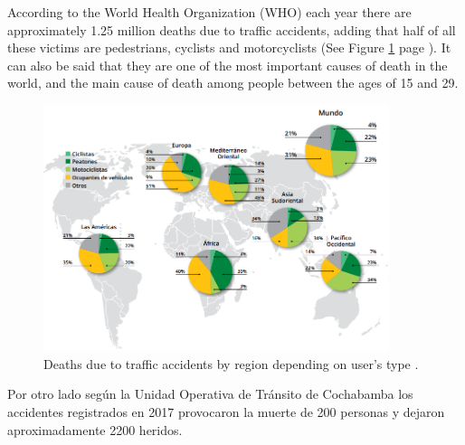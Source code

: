 According to the World Health Organization (WHO) each year there are approximately 1.25 million deaths due to traffic accidents, adding that half of all these victims are pedestrians, cyclists and motorcyclists (See Figure \ref{fig:oms} page \pageref{fig:oms}). It can also be said that they are one of the most important causes of death in the world, and the main cause of death among people between the ages of 15 and 29.

\vspace{5mm} %

\begin{figure}[h!]
  \begin{center}	\includegraphics[width=0.9\textwidth, fbox]{imagenes/Cap1/oms1}
  \caption{Deaths due to traffic accidents by region depending on user's type \protect\cite{Reference65}.}
  \label{fig:oms}  
  \end{center}
\end{figure}

Por otro lado seg\'{u}n la Unidad Operativa de Tr\'{a}nsito de Cochabamba los accidentes registrados en 2017 provocaron la muerte de 200 personas y dejaron aproximadamente 2200 heridos.
	
\vspace{5mm} %

